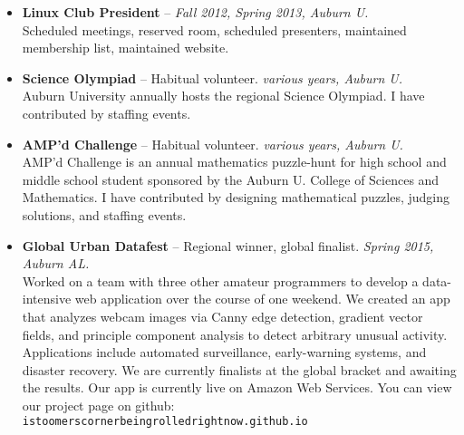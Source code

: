 \documentclass[11pt]{article}
\begin{document}
{\begin{itemize}
        hosts several puzzle-hunts each year. In addition to regular
        participation, I have served as an organizer for two
        puzzle-hunts. I contributed through designing puzzles, event
        production, and event staffing.
    \item{}
      {\bf Linux Club President} --
      {\em Fall 2012, Spring 2013, Auburn U.}\\
        Scheduled meetings, reserved room, scheduled presenters,
        maintained membership list, maintained website.
    \item{}
      {\bf Science Olympiad} --
      {Habitual volunteer.}
      {\em various years, Auburn U.}\\
        Auburn University annually hosts the regional Science Olympiad.
        I have contributed by staffing events.
    \item{}
      {\bf AMP'd Challenge} --
      {Habitual volunteer.}
      {\em various years, Auburn U.}\\
        AMP'd Challenge is an annual mathematics puzzle-hunt for high
        school and middle school student sponsored by the Auburn U.
        College of Sciences and Mathematics. I have contributed by
        designing mathematical puzzles, judging solutions, and staffing
        events.
    \item{}
      {\bf Global Urban Datafest} --
      {Regional winner, global finalist.}
      {\em Spring 2015, Auburn AL.}\\
        Worked on a team with three other amateur programmers to develop
        a data-intensive web application over the course of one weekend.
        We created an app that analyzes webcam images via Canny edge
        detection, gradient vector fields, and principle component
        analysis to detect arbitrary unusual activity. Applications
        include automated surveillance, early-warning systems, and
        disaster recovery. We are currently finalists at the global
        bracket and awaiting the results. Our app is currently live on
        Amazon Web Services. You can view our project page on github:
        {\tt istoomerscornerbeingrolledrightnow.github.io}
  \end{itemize}
}
\end{document}
